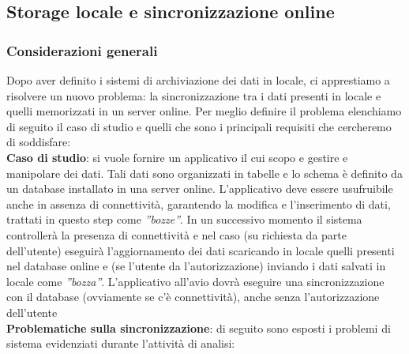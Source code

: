 \documentclass[10pt,a4paper,onecolumn]{article}
\begin{document}
\subsection{Storage locale e sincronizzazione online}

\subsubsection{Considerazioni generali}

Dopo aver definito i sistemi di archiviazione dei dati in locale, ci apprestiamo a risolvere un nuovo problema: la sincronizzazione tra i dati presenti in locale e quelli memorizzati in un server online. Per meglio definire il problema elenchiamo di seguito il caso di studio e quelli che sono i principali requisiti che cercheremo di soddisfare:\\

\textbf{Caso di studio}: si vuole fornire un applicativo il cui scopo e gestire e manipolare dei dati. Tali dati sono organizzati in tabelle e lo schema è definito da un database installato in una server online. L'applicativo deve essere usufruibile anche in assenza di connettività, garantendo la modifica e l'inserimento di dati, trattati in questo step come \textit{''bozze''}. In un successivo momento il sistema controllerà la presenza di connettività e nel caso (su richiesta da parte dell'utente) eseguirà l'aggiornamento dei dati scaricando in locale quelli presenti nel database online e (se l'utente da l'autorizzazione) inviando i dati salvati in locale come \textit{''bozza''}. L'applicativo all'avio dovrà eseguire una sincronizzazione con il database (ovviamente se c'è connettività), anche senza l'autorizzazione dell'utente\\

\textbf{Problematiche sulla sincronizzazione}: di seguito sono esposti i problemi di sistema evidenziati durante l'attività di analisi: 
\end{document}
